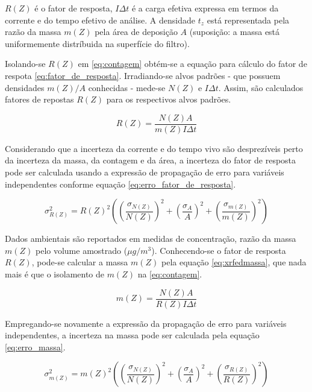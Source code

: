 $R(Z)$ é o fator de resposta, $I\Delta t$ é a carga efetiva expressa
em termos da corrente e do tempo efetivo de análise.
A densidade $t_z$ está representada pela razão da massa $m(Z)$ pela 
área de deposição $A$ (suposição: a massa está uniformemente distríbuida 
na superfície do filtro).

Isolando-se $R(Z)$ em \ref{eq:contagem} obtém-se a equação para cálculo 
do fator de respota \ref{eq:fator_de_resposta}.
Irradiando-se alvos padrões - que possuem densidades $m(Z)/A$ conhecidas - 
mede-se $N(Z)$ e $I \Delta t$. Assim, são calculados fatores de repostas $R(Z)$ 
para os respectivos alvos padrões. 

\begin{equation}
  \label{eq:fator_de_resposta}
  R(Z) = \frac{N(Z) A}{m(Z)I \Delta t}
\end{equation}

Considerando que a incerteza da corrente e do tempo vivo são
desprezíveis perto da incerteza da massa, da contagem e da área, 
a incerteza do fator de resposta pode ser calculada usando a expressão
de propagação de erro para variáveis independentes conforme equação 
\ref{eq:erro_fator_de_resposta}.

\begin{equation}
  \label{eq:erro_fator_de_resposta}
  \sigma_{R(Z)}^2 = {R(Z)}^2 \left( \left(\frac{\sigma_{N(Z)}}{N(Z)}\right)^2 + 
                                  \left(\frac{\sigma_A}{A}\right)^2 + 
                                  \left(\frac{\sigma_{m(Z)}}{m(Z)}\right)^2 
                             \right)
\end{equation}

Dados ambientais são reportados em medidas de concentração,
razão da massa $m(Z)$ pelo volume amostrado ($\mu g/m^3$).
Conhecendo-se o fator de resposta $R(Z)$, pode-se calcular a massa $m(Z)$ 
pela equação \ref{eq:xrfedmassa}, que nada mais é que o isolamento de $m(Z)$ na 
\ref{eq:contagem}. 

\begin{equation}
  \label{eq:xrfedmassa}
  m(Z) = \frac{N(Z) A}{ R(Z)I \Delta t}
\end{equation}

Empregando-se novamente a expressão da propagação de erro para variáveis independentes, 
a incerteza na massa pode ser calculada pela equação \ref{eq:erro_massa}.

\begin{equation}
  \label{eq:erro_massa}
  \sigma_{m(Z)}^2 = {m(Z)}^2 \left( \left(\frac{\sigma_{N(Z)}}{N(Z)}\right)^2 + 
                                  \left(\frac{\sigma_A}{A}\right)^2 + 
                                  \left(\frac{\sigma_{R(Z)}}{R(Z)}\right)^2 
                             \right)
\end{equation}


